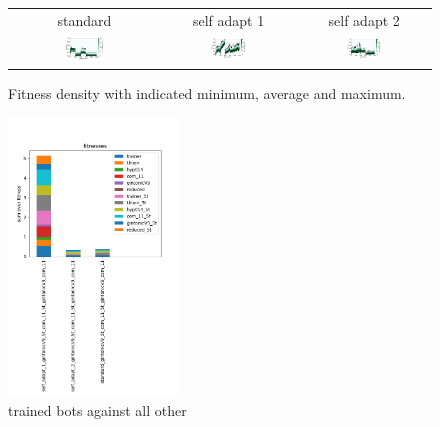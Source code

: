 \documentclass[11pt,a4paper]{scrartcl}
\begin{document}
\begin{figure}[H]
\center
\begin{tabular}{ccc}
standard & self adapt 1 & self adapt 2 \\
\includegraphics[width=0.3\textwidth]{img/standard_gintonicV9_5t_com_11_5t_gintonicV9_com_11.png} &
\includegraphics[width=0.3\textwidth]{img/self_adapt_1_gintonicV9_5t_com_11_5t_gintonicV9_com_11.png} &
\includegraphics[width=0.3\textwidth]{img/self_adapt_2_gintonicV9_5t_com_11_5t_gintonicV9_com_11.png} \\
\end{tabular}
\caption{Fitness density with indicated minimum, average and maximum.}
\label{fig:changing opponent}
\end{figure}

\begin{figure}[H]
\center
\includegraphics[width=0.4\textwidth]{img/change.png}
\caption{trained bots against all other}
\label{fig:change}
\end{figure}
\end{document}
